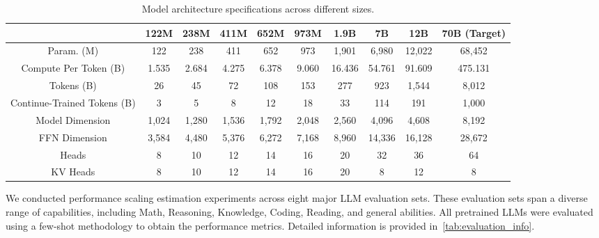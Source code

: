 \begin{table}[!t]
\centering
\small
\caption{Model architecture specifications across different sizes.}
\setlength{\tabcolsep}{2.5pt}
\begin{tabular}{c|ccccccccc}
\toprule
 & 122M & 238M & 411M & 652M & 973M & 1.9B & 7B & 12B & 70B (Target) \\
\midrule
Param. (M) & 122 & 238 & 411 & 652 & 973 & 1,901 & 6,980 & 12,022 & 68,452 \\
Compute Per Token (B) & 1.535 & 2.684 & 4.275 & 6.378 & 9.060 & 16.436 & 54.761 & 91.609 & 475.131 \\
Tokens (B) & 26 & 45 & 72 & 108 & 153 & 277 & 923 & 1,544 & 8,012 \\
Continue-Trained Tokens (B) & 3 & 5 & 8 & 12 & 18 & 33 & 114 & 191 & 1,000 \\
Model Dimension & 1,024 & 1,280 & 1,536 & 1,792 & 2,048 & 2,560 & 4,096 & 4,608 & 8,192 \\
FFN Dimension & 3,584 & 4,480 & 5,376 & 6,272 & 7,168 & 8,960 & 14,336 & 16,128 & 28,672 \\
Heads & 8 & 10 & 12 & 14 & 16 & 20 & 32 & 36 & 64 \\
KV Heads & 8 & 10 & 12 & 14 & 16 & 20 & 8 & 12 & 8 \\
\bottomrule
\end{tabular}
\label{tab:model_configs_dense}
\end{table}


We conducted performance scaling estimation experiments across eight major LLM evaluation sets. These evaluation sets span a diverse range of capabilities, including Math, Reasoning, Knowledge, Coding, Reading, and general abilities. All pretrained LLMs were evaluated using a few-shot methodology to obtain the performance metrics. Detailed information is provided in~\cref{tab:evaluation_info}. 

